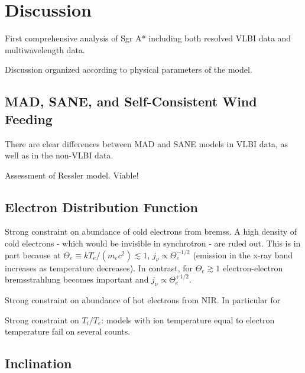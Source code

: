 \section{Discussion}\label{sec:discussions}

First comprehensive analysis of Sgr A* including both resolved VLBI data and multiwavelength data.

Discussion organized according to physical parameters of the model.


\subsection{MAD, SANE, and Self-Consistent Wind Feeding}


There are clear differences between MAD and SANE models in VLBI data, as well as in the non-VLBI data.

Assessment of Ressler model.  Viable!

\subsection{Electron Distribution Function}


Strong constraint on abundance of cold electrons from bremss.  A high density of cold electrons - which would be invisible in synchrotron - are ruled out.  This is in part because at $\Theta_e \equiv k T_e/(m_e c^2) \lesssim 1$, $j_\nu \propto \Theta_e^{-1/2}$ (emission in the x-ray band increases as temperature decreases).  In contrast, for $\Theta_e \gtrsim 1$ electron-electron bremsstrahlung becomes important and $j_\nu \propto \Theta_e^{+1/2}$.

Strong constraint on abundance of hot electrons from NIR.  In particular for

Strong constraint on $T_i/T_e$: models with ion temperature equal to electron temperature fail on several counts.

\subsection{Inclination}

